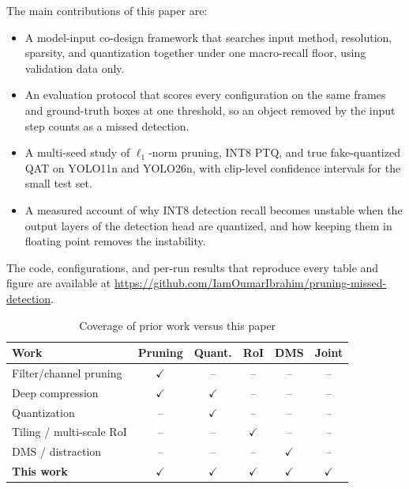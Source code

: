 \documentclass[conference]{IEEEtran}
\begin{document}
The main contributions of this paper are:
\begin{itemize}
    \item A model-input co-design framework that searches input method, resolution, sparsity, and quantization together under one macro-recall floor, using validation data only.
    \item An evaluation protocol that scores every configuration on the same frames and ground-truth boxes at one threshold, so an object removed by the input step counts as a missed detection.
    \item A multi-seed study of $\ell_1$-norm pruning, INT8 PTQ, and true fake-quantized QAT on YOLO11n and YOLO26n, with clip-level confidence intervals for the small test set.
    \item A measured account of why INT8 detection recall becomes unstable when the output layers of the detection head are quantized, and how keeping them in floating point removes the instability.
\end{itemize}
The code, configurations, and per-run results that reproduce every table and figure are available at \url{https://github.com/IamOumarIbrahim/pruning-missed-detection}.


\begin{table}[t]
\caption{Coverage of prior work versus this paper}
\label{tab:gap}
\centering
\footnotesize
\setlength{\tabcolsep}{3pt}
\begin{tabular}{@{}lccccc@{}}
\toprule
\textbf{Work} & \textbf{Pruning} & \textbf{Quant.} & \textbf{RoI} & \textbf{DMS} & \textbf{Joint} \\
\midrule
Filter/channel pruning \cite{b9,b10,b11,b12} & $\checkmark$ & -- & -- & -- & -- \\
Deep compression \cite{b8}                   & $\checkmark$ & $\checkmark$ & -- & -- & -- \\
Quantization \cite{b13,b14}                  & -- & $\checkmark$ & -- & -- & -- \\
Tiling / multi-scale RoI \cite{b18,b19}      & -- & -- & $\checkmark$ & -- & -- \\
DMS / distraction \cite{b20,b21,b22}         & -- & -- & -- & $\checkmark$ & -- \\
\midrule
\textbf{This work} & $\checkmark$ & $\checkmark$ & $\checkmark$ & $\checkmark$ & $\checkmark$ \\
\bottomrule
\end{tabular}
\end{table}
\end{document}
